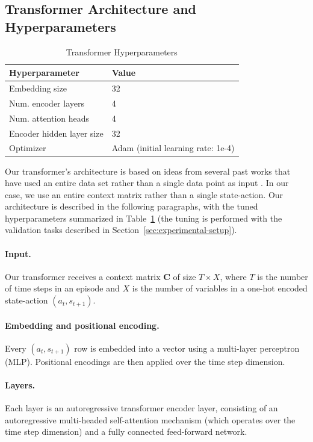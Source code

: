 \documentclass[sigconf]{aamas}
\begin{document}
\subsection{Transformer Architecture and Hyperparameters}\label{sec:transformer}
\begin{table}[t]
\centering
\caption{Transformer Hyperparameters}
\begin{tabular}{@{}ll@{}}
\toprule
Hyperparameter            & Value                              \\ \midrule
Embedding size            & 32                                 \\
Num. encoder layers       & 4                                  \\
Num. attention heads      & 4                                  \\
Encoder hidden layer size & 32                                 \\
Optimizer                 & Adam (initial learning rate: 1e-4) \\ \bottomrule
\end{tabular}
\label{tab:hyperparams}
\end{table}
Our transformer's architecture is based on ideas from several past works that have used an entire data set rather than a single data point as input \cite{kossenSelfAttentionDatapointsGoing2021,goyalRetrievalAugmentedReinforcementLearning2022,keLearningInduceCausal2022,mullerTransformersCanBayesian2022}. In our case, we use an entire context matrix rather than a single state-action. Our architecture is described in the following paragraphs, with the tuned hyperparameters summarized in Table~\ref{tab:hyperparams} (the tuning is performed with the validation tasks described in Section~\ref{sec:experimental-setup}).
\paragraph{Input.} Our transformer receives a context matrix $\mathbf{C}$ of size $T \times X$, where $T$ is the number of time steps in an episode and $X$ is the number of variables in a one-hot encoded state-action $(a_t, s_{t+1})$.
\paragraph{Embedding and positional encoding.} Every $(a_t, s_{t+1})$ row is embedded into a vector using a multi-layer perceptron (MLP). Positional encodings are then applied over the time step dimension.
\paragraph{Layers.} Each layer is an autoregressive transformer encoder layer, consisting of an autoregressive multi-headed self-attention mechanism (which operates over the time step dimension) and a fully connected feed-forward network.
\end{document}
